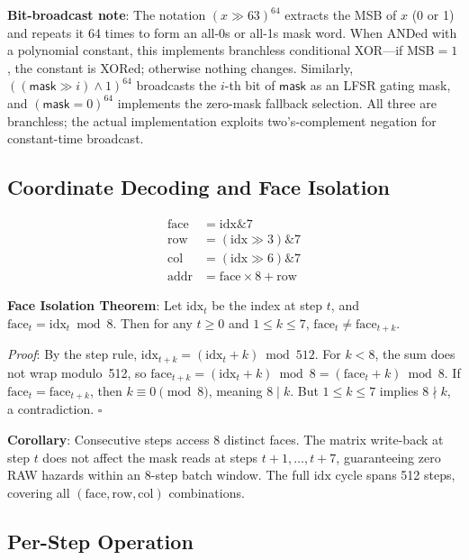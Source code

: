 \documentclass[11pt,a4paper]{article}
\begin{document}
\textbf{Bit-broadcast note}: The notation $(x \gg 63)^{64}$ extracts the MSB of
$x$ (0 or 1) and repeats it 64 times to form an all-0s or all-1s mask word.
When ANDed with a polynomial constant, this implements branchless conditional
XOR---if MSB${}=1$, the constant is XORed; otherwise nothing changes. Similarly,
$((\mathsf{mask} \gg i) \land 1)^{64}$ broadcasts the $i$-th bit of
$\mathsf{mask}$ as an LFSR gating mask, and $(\mathsf{mask} = 0)^{64}$
implements the zero-mask fallback selection. All three are branchless; the
actual implementation exploits two's-complement negation \cite{chacha} for
constant-time broadcast.

\subsection{Coordinate Decoding and Face Isolation}

\begin{equation}
\begin{aligned}
\mathrm{face} &= \mathrm{idx} \mathbin{\&} 7 \\
\mathrm{row}  &= (\mathrm{idx} \gg 3) \mathbin{\&} 7 \\
\mathrm{col}  &= (\mathrm{idx} \gg 6) \mathbin{\&} 7 \\
\mathrm{addr} &= \mathrm{face} \times 8 + \mathrm{row}
\end{aligned}
\end{equation}

\textbf{Face Isolation Theorem}: Let $\mathrm{idx}_t$ be the index at step $t$,
and $\mathrm{face}_t = \mathrm{idx}_t \bmod 8$. Then for any $t \ge 0$ and
$1 \le k \le 7$, $\mathrm{face}_t \neq \mathrm{face}_{t+k}$.

\textit{Proof}: By the step rule, $\mathrm{idx}_{t+k} = (\mathrm{idx}_t + k)
\bmod 512$. For $k < 8$, the sum does not wrap modulo~512, so
$\mathrm{face}_{t+k} = (\mathrm{idx}_t + k) \bmod 8 = (\mathrm{face}_t + k)
\bmod 8$. If $\mathrm{face}_t = \mathrm{face}_{t+k}$, then $k \equiv 0
\pmod 8$, meaning $8 \mid k$. But $1 \le k \le 7$ implies $8 \nmid k$,
a contradiction. $\square$

\textbf{Corollary}: Consecutive steps access 8 distinct faces. The matrix
write-back at step $t$ does not affect the mask reads at steps $t+1,\dots,t+7$,
guaranteeing zero RAW hazards within an 8-step batch window. The full $\mathrm{idx}$
cycle spans 512 steps, covering all $(\mathrm{face}, \mathrm{row}, \mathrm{col})$
combinations.

\subsection{Per-Step Operation}
\end{document}
